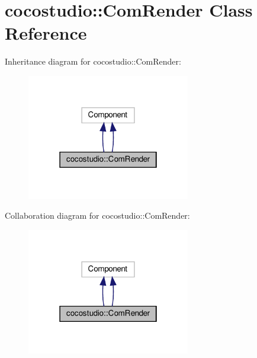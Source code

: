 \hypertarget{classcocostudio_1_1ComRender}{}\section{cocostudio\+:\+:Com\+Render Class Reference}
\label{classcocostudio_1_1ComRender}


Inheritance diagram for cocostudio\+:\+:Com\+Render\+:
\nopagebreak
\begin{figure}[H]
\begin{center}
\leavevmode
\includegraphics[width=202pt]{classcocostudio_1_1ComRender__inherit__graph}
\end{center}
\end{figure}


Collaboration diagram for cocostudio\+:\+:Com\+Render\+:
\nopagebreak
\begin{figure}[H]
\begin{center}
\leavevmode
\includegraphics[width=202pt]{classcocostudio_1_1ComRender__coll__graph}
\end{center}
\end{figure}
